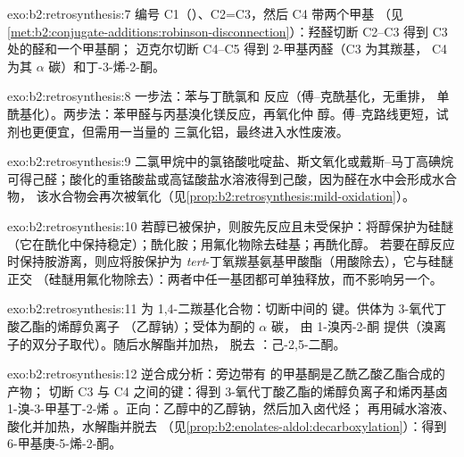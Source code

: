 \begin{solution}{exo:b2:retrosynthesis:7}
编号 C1（）、C2=C3，然后 C4 带两个甲基
（见\cref{met:b2:conjugate-additions:robinson-disconnection}）：羟醛切断 C2--C3 得到 C3 处的醛和一个甲基酮；
迈克尔切断 C4--C5 得到 2-甲基丙醛（C3 为其羰基，
C4 为其 $\alpha$ 碳）和丁-3-烯-2-酮。
\end{solution}

\begin{solution}{exo:b2:retrosynthesis:8}
一步法：苯与丁酰氯和  反应（傅–克酰基化，无重排，
单酰基化）。两步法：苯甲醛与丙基溴化镁反应，再氧化仲
醇。傅–克路线更短，试剂也更便宜，但需用一当量的
三氯化铝，最终进入水性废液。
\end{solution}

\begin{solution}{exo:b2:retrosynthesis:9}
二氯甲烷中的氯铬酸吡啶盐、斯文氧化或戴斯–马丁高碘烷
可得己醛；酸化的重铬酸盐或高锰酸盐水溶液得到己酸，因为醛在水中会形成水合物，
该水合物会再次被氧化（见\cref{prop:b2:retrosynthesis:mild-oxidation}）。
\end{solution}

\begin{solution}{exo:b2:retrosynthesis:10}
若醇已被保护，则胺先反应且未受保护：将醇保护为硅醚
（它在酰化中保持稳定）；酰化胺；用氟化物除去硅基；再酰化醇。
若要在醇反应时保持胺游离，则应将胺保护为
\textit{tert}-丁氧羰基氨基甲酸酯（用酸除去），它与硅醚正交
（硅醚用氟化物除去）：两者中任一基团都可单独释放，而不影响另一个。
\end{solution}

\begin{solution}{exo:b2:retrosynthesis:11}
 为 1,4-二羰基化合物：切断中间的  键。供体为 3-氧代丁酸乙酯的烯醇负离子
（乙醇钠）；受体为酮的 $\alpha$ 碳，
由 1-溴丙-2-酮  提供（溴离子的双分子取代）。随后水解酯并加热，
脱去 ：己-2,5-二酮。
\end{solution}

\begin{solution}{exo:b2:retrosynthesis:12}
逆合成分析：旁边带有  的甲基酮是乙酰乙酸乙酯合成的产物；
切断 C3 与 C4 之间的键：得到 3-氧代丁酸乙酯的烯醇负离子和烯丙基卤
1-溴-3-甲基丁-2-烯 。正向：乙醇中的乙醇钠，然后加入卤代烃；
再用碱水溶液、酸化并加热，水解酯并脱去 
（见\cref{prop:b2:enolates-aldol:decarboxylation}）：得到 6-甲基庚-5-烯-2-酮。
\end{solution}

